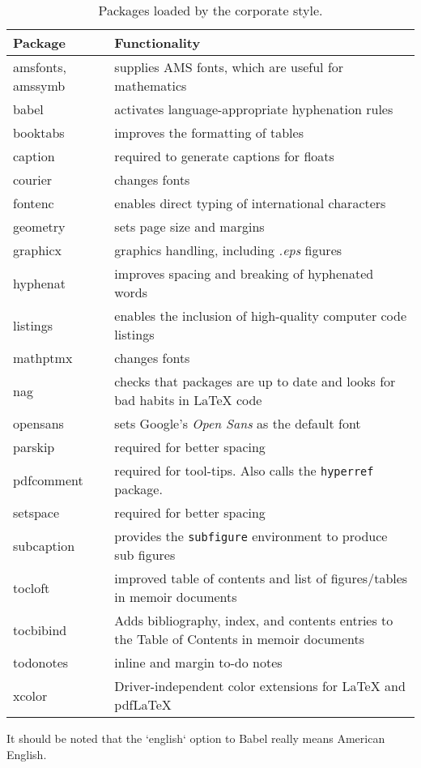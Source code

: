 \begin{table}[!ht]
\centering
\caption[Packages loaded by the corporate style]{Packages loaded by the corporate style.}
\label{tab:incpacks}
\begin{tabular}{p{}p{}}
\toprule
Package &  Functionality\\
\midrule
amsfonts, amssymb & supplies AMS fonts, which are useful for mathematics \\
babel &  activates language-appropriate hyphenation rules\\
booktabs & improves the formatting of tables \\
caption & required to generate captions for floats\\
courier& changes fonts \\
fontenc &  enables direct typing of international characters \\
geometry & sets page size and margins \\
graphicx & graphics handling, including \emph{.eps} figures \\
hyphenat & improves spacing and breaking of hyphenated words \\
listings & enables the inclusion of high-quality computer code listings\\
mathptmx& changes fonts \\
nag & checks that packages are up to date and looks for bad habits in LaTeX code\\
opensans& sets Google's \emph{Open Sans} as the default font\\
parskip & required for better spacing\\
pdfcomment & required for tool-tips. Also calls the \texttt{hyperref} package.\\
setspace & required for better spacing\\
subcaption & provides the \texttt{subfigure} environment to produce sub figures \\
tocloft & improved table of contents and list of figures/tables in memoir documents\\
tocbibind &  Adds bibliography, index, and contents entries to the Table of Contents in memoir documents\\
todonotes &  inline and margin to-do notes \\
xcolor &  Driver-independent color extensions for LaTeX and pdfLaTeX\\
\bottomrule
\end{tabular}
\end{table}

It should be noted that the `english` option to Babel really means American English.
